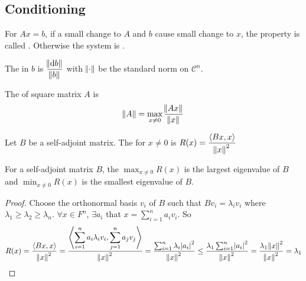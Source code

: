 \subsection{Conditioning}

\begin{definition}
    For $Ax=b$, if a small change to $A$ and $b$ cause small change to $x$, the property is called . Otherwise the system is .
\end{definition}

\begin{definition}
    The  in $b$ is $\displaystyle \frac{\norm{\dif{b}}}{\norm{b}}$ with $\norm{\cdot}$ be the standard norm on $\mathcal{C}^n$.
\end{definition}

\begin{definition}
    The  of square matrix $A$ is 
    \begin{equation}
        \norm{A} = \max_{x \neq 0} \frac{\norm{Ax}}{\norm{x}}
    \end{equation}
\end{definition}


\begin{definition}
    Let $B$ be a self-adjoint matrix. The  for $x \neq 0$ is $\displaystyle R(x) = \frac{\left\langle \displaystyle Bx, x \right\rangle}{\norm{x}^2}$
\end{definition}


\begin{theorem}
For a self-adjoint matrix $B$, the $\displaystyle \max_{x \neq 0} R(x)$ is the largest eigenvalue of $B$ and $\displaystyle \min_{x \neq 0} R(x)$ is the smallest eigenvalue of $B$.
\end{theorem}
\begin{proof}
    Choose the orthonormal basis $v_i$ of $B$ such that $Bv_i = \lambda_i v_i$ where $\lambda_1 \geq \lambda_2 \geq \lambda_n$. $\forall x \in F^n$, $\exists a_i$ that $\displaystyle x = \sum_{i=1}^n a_i v_i$. So
    \begin{equation*}
        R(x) = \frac{\left\langle \displaystyle Bx, x \right\rangle}{\norm{x}^2} = \frac{\left\langle \displaystyle \sum_{i=1}^n a_i \lambda_i v_i, \sum_{j=1}^n a_j v_j \right\rangle}{\norm{x}^2} = \frac{\sum_{i=1}^n \lambda_i \abs{a_i}^2}{\norm{x}^2} \leq \frac{\lambda_1 \sum_{i=1}^n \abs{a_i}^2}{\norm{x}^2} = \frac{\lambda_1 \norm{x}^2}{\norm{x}^2} = \lambda_1
    \end{equation*}
\end{proof}

